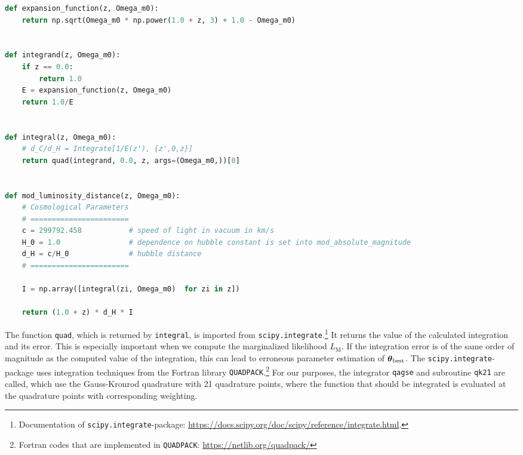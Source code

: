 \begin{lstlisting}[language=Python, caption={Function for $E(z)$ and $\mathcal{D}_{\text{L}}(z, \Omega_{\text{m},0})$.}, label={lst:MWE-expansion-function-and-modified-luminosity-distance}]
def expansion_function(z, Omega_m0):
    return np.sqrt(Omega_m0 * np.power(1.0 + z, 3) + 1.0 - Omega_m0)


def integrand(z, Omega_m0):
    if z == 0.0:
        return 1.0
    E = expansion_function(z, Omega_m0)
    return 1.0/E


def integral(z, Omega_m0):
    # d_C/d_H = Integrate[1/E(z'), {z',0,z}]
    return quad(integrand, 0.0, z, args=(Omega_m0,))[0]


def mod_luminosity_distance(z, Omega_m0):
    # Cosmological Parameters
    # =======================
    c = 299792.458           # speed of light in vacuum in km/s
    H_0 = 1.0                # dependence on hubble constant is set into mod_absolute_magnitude
    d_H = c/H_0              # hubble distance
    # =======================
    
    I = np.array([integral(zi, Omega_m0)  for zi in z])
   
    return (1.0 + z) * d_H * I
\end{lstlisting}
The function \colorbox{backcolor}{\lstinline{quad}}, which is returned by \colorbox{backcolor}{\lstinline{integral}}, is imported from \colorbox{backcolor}{\lstinline{scipy.integrate}}.\footnote{Documentation of \colorbox{backcolor}{\lstinline{scipy.integrate}}-package: \href{https://docs.scipy.org/doc/scipy/reference/integrate.html}{https://docs.scipy.org/doc/scipy/reference/integrate.html}.} It returns the value of the calculated integration and its error. This is especially important when we compute the marginalized likelihood $L_{\text{M}}$. If the integration error is of the same order of magnitude as the computed value of the integration, this can lead to erroneous parameter estimation of $\vb*{\theta}_{\text{best}}$. The \colorbox{backcolor}{\lstinline{scipy.integrate}}-package uses integration techniques from the Fortran library \colorbox{backcolor}{\lstinline{QUADPACK}}.\footnote{Fortran codes that are implemented in \colorbox{backcolor}{\lstinline{QUADPACK}}: \href{https://netlib.org/quadpack/}{https://netlib.org/quadpack/}} For our purposes, the integrator \colorbox{backcolor}{\lstinline{qagse}} and subroutine \colorbox{backcolor}{\lstinline{qk21}} are called, which use the Gauss-Kronrod quadrature with 21 quadrature points, where the function that should be integrated is evaluated at the quadrature points with corresponding weighting. \\

